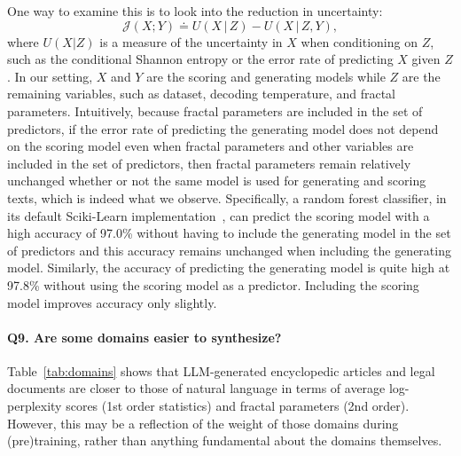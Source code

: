 One way to examine this is to look into the reduction in uncertainty:
\begin{equation}
    \mathcal{J}(X; Y) \doteq U(X\,|\,Z) - U(X\,|\,Z, Y),
\end{equation} 
where $U(X|Z)$ is a measure of the uncertainty in $X$ when conditioning on $Z$, such as the conditional Shannon entropy or the error rate of predicting $X$ given $Z$. In our setting, $X$ and $Y$ are the scoring and generating models while $Z$ are the remaining variables, such as dataset, decoding temperature, and fractal parameters. Intuitively, because fractal parameters are included in the set of predictors, if the error rate of predicting the generating model does not depend on the scoring model even when fractal parameters and other variables are included in the set of predictors, then fractal parameters remain relatively unchanged whether or not the same model is used for generating and scoring texts, which is indeed what we observe. Specifically, a random forest classifier, in its default Sciki-Learn implementation~\citep{scikit-learn}, can predict the scoring model with a high accuracy of 97.0\% without having to include the generating model in the set of predictors and this accuracy remains unchanged when including the generating model. Similarly, the accuracy of predicting the generating model is quite high at 97.8\% without using the scoring model as a predictor. Including the scoring model improves accuracy only slightly.

\paragraph{Q9. Are some domains easier to synthesize?} 
Table~\ref{tab:domains} shows that LLM-generated encyclopedic articles and legal documents are closer to those of natural language in terms of average log-perplexity scores (1st order statistics) and fractal parameters (2nd order). However, this may be a reflection of the weight of those domains during (pre)training, rather than anything fundamental about the domains themselves.



